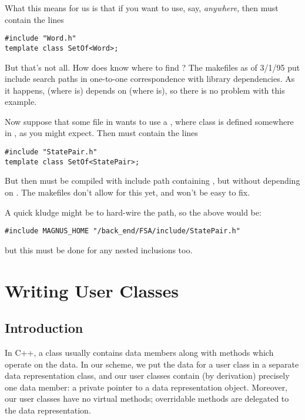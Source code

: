 What this means for us is that if you want to use, say,
 {\em anywhere}, then  must contain
the lines

\begin{verbatim}
#include "Word.h"
template class SetOf<Word>;
\end{verbatim}

But that's not all. How does  know where to find
? The makefiles as of 3/1/95 put include search paths in
one-to-one correspondence with library dependencies. As it happens,
 (where  is) depends on  (where
 is), so there is no problem with this example.

Now suppose that some file in  wants to use a
, where class  is defined somewhere
in , as you might expect. Then  must contain
the lines

\begin{verbatim}
#include "StatePair.h"
template class SetOf<StatePair>;
\end{verbatim}

\noindent
But then  must be compiled with include path containing
, but without  depending on
. The makefiles don't allow for this yet, and won't be
easy to fix.

A quick kludge might be to hard-wire the path, so the above would be:

\begin{verbatim}
#include MAGNUS_HOME "/back_end/FSA/include/StatePair.h"
\end{verbatim}

\noindent
but this must be done for any nested inclusions too.




\section{Writing User Classes}\label{user_classes}

\subsection{Introduction}

In C++, a class usually contains data members along with methods
which operate on the data. In our scheme, we put the data for a user
class in a separate data representation class, and our user classes
contain (by derivation) precisely one data member: a private pointer to a data
representation object. Moreover, our user classes have no virtual methods;
overridable methods are delegated to the data representation.

